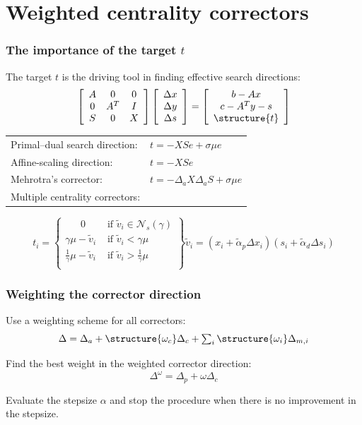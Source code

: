 \documentclass{beamer}
\renewcommand{\em}{\structure}
\begin{document}
%
%
\section{Weighted centrality correctors}

\frame
{
  \frametitle{The importance of the target $t$}

  The target $t$ is the driving tool in finding effective search directions:
  \[
  \left[ \begin{array}{ccc}
      A & 0   & 0 \\
      0 & A^T & I \\
      S & 0   & X
    \end{array} \right]
  \left[ \begin{array}{c}
      \Delta x \\ \Delta y \\ \Delta s
    \end{array} \right] =
  \left[ \begin{array}{c}
      b-Ax \\ c-A^Ty-s \\ \em{t}
    \end{array} \right]
  \]

  \begin{tabular}{ll}
  Primal--dual search direction: & $t = -XSe +\sigma\mu e$ \\
  Affine-scaling direction:      & $t = -XSe$ \\
  Mehrotra's corrector:          & $t = -\Delta_a X \Delta_a S +\sigma\mu e$ \\
  Multiple centrality correctors:  \\
  \end{tabular}
  \[
  t_i = \left\{
  \begin{array}{ll}
    \quad\;\; 0 & \mbox{ if } \tilde v_i \in \mathcal{N}_s(\gamma) \\
    \gamma\mu -\tilde v_i& \mbox{ if }\tilde v_i < \gamma\mu\\
    \frac{1}{\gamma}\mu-\tilde v_i& \mbox{ if }\tilde v_i>\frac{1}{\gamma}\mu\\
  \end{array} \right\}
  \tilde v_i= (x_i+\tilde\alpha_p \Delta x_i)(s_i+\tilde\alpha_d \Delta s_i)
  \]
}

\frame
{
  \frametitle{Weighting the corrector direction}

  Use a weighting scheme for all correctors:
  \[
  \Delta = \Delta_a +\em{\omega_c}\Delta_c + 
           \textstyle \sum_i \em{\omega_i} \Delta_{m,i}
  \]

  Find the best weight in the weighted corrector direction:
  \[
  \Delta^\omega = \Delta_p +\omega\Delta_c
  \]

  Evaluate the stepsize $\alpha$ and stop the procedure when there is no
  improvement in the stepsize.
}
\end{document}
